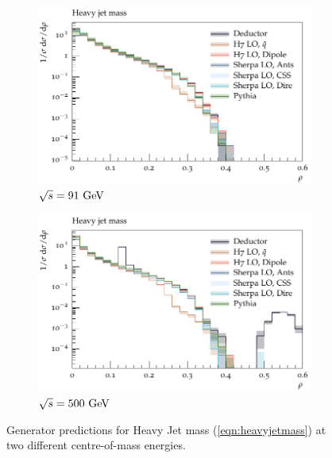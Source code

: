 \begin{figure}[h]
  \centering
  \begin{subfigure}[t]{0.49\textwidth}
    \includegraphics[width=\textwidth]{plots/EE-91-MuShower/MC_EETOJETS/HeavyJetMass.pdf}
    \caption{$\sqrt{s} = 91~\textrm{GeV}$}
    \label{fig:ee:heavyjetmass:91}
  \end{subfigure}
  \begin{subfigure}[t]{0.49\textwidth}
    \includegraphics[width=\textwidth]{plots/EE-500-MuShower/MC_EETOJETS/HeavyJetMass.pdf}
    \caption{$\sqrt{s} = 500~\textrm{GeV}$}
    \label{fig:ee:heavyjetmass:500}
  \end{subfigure}
  \caption{Generator predictions for Heavy Jet mass (\ref{eqn:heavyjetmass}) at two different centre-of-mass energies.}
  \label{fig:ee:heavyjetmass}
\end{figure}

